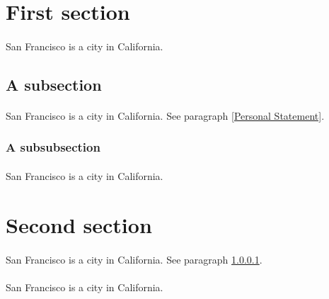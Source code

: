 \documentclass[oneside]{book}
\begin{document}
\section{First section}

\paragraph{}\label{Personal Statement}
San Francisco is a city in California.

\subsection{A subsection}

\paragraph{}
San Francisco is a city in California.  See paragraph \ref{Personal
Statement}.

\subsubsection{A subsubsection}

\paragraph{}
San Francisco is a city in California.

\section{Second section}

\paragraph{}
San Francisco is a city in California. See paragraph \ref{Personal Statement}.

\paragraph{}
San Francisco is a city in California.
\end{document}
